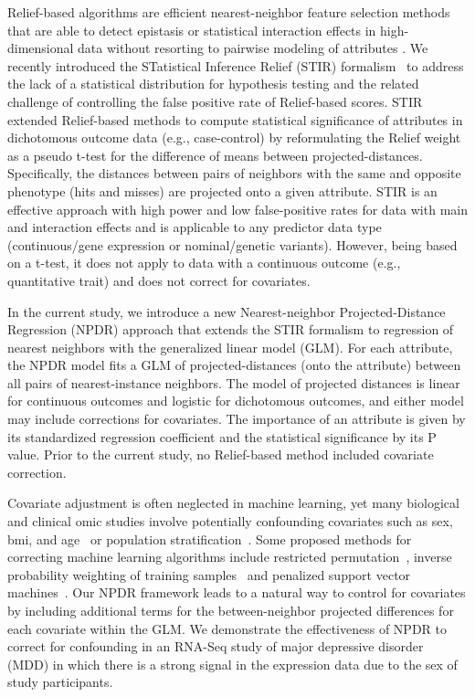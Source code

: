 \documentclass[10pt]{article}
\begin{document}
Relief-based algorithms are efficient nearest-neighbor feature selection methods that are able to detect epistasis or statistical interaction effects in high-dimensional data without resorting to pairwise modeling of attributes \cite{urbanowicz17b,kononenko97, mckinney09, robnik2003theoretical}.
We recently introduced the STatistical Inference Relief (STIR) formalism~\cite{stir} to address the lack of a statistical distribution for hypothesis testing and the related challenge of controlling the false positive rate of Relief-based scores.
STIR extended Relief-based methods to compute statistical significance of attributes in dichotomous outcome data (e.g., case-control) by reformulating the Relief weight~\cite{mckinney13} as a pseudo t-test for the difference of means between projected-distances. Specifically, the distances between pairs of neighbors with the same and opposite phenotype (hits and misses) are projected onto a given attribute. STIR is an effective approach with high power and low false-positive rates for data with main and interaction effects and is applicable to any predictor data type (continuous/gene expression or nominal/genetic variants). However, being based on a t-test, it does not apply to data with a continuous outcome (e.g., quantitative trait) and does not correct for covariates.

In the current study, we introduce a new Nearest-neighbor Projected-Distance Regression (NPDR) approach that extends the STIR formalism to regression of nearest neighbors with the generalized linear model (GLM). For each attribute, the NPDR model fits a GLM of projected-distances (onto the attribute) between all pairs of nearest-instance neighbors.
The model of projected distances is linear for continuous outcomes and logistic for dichotomous outcomes, and either model may include corrections for covariates.
The importance of an attribute is given by its standardized regression coefficient and the statistical significance by its P value. Prior to the current study, no Relief-based method included covariate correction.  

Covariate adjustment is often neglected in machine learning, yet many biological and clinical omic studies involve potentially confounding covariates such as sex, bmi, and age~\cite{le18_brainagesim} or population stratification~\cite{popstrat16}.
Some proposed methods for correcting machine learning algorithms include restricted permutation~\cite{rao2017}, inverse probability weighting of training samples~\cite{linn2016} and penalized support vector machines~\cite{li2011ccsvm}.
Our NPDR framework leads to a natural way to control for covariates by including additional terms for the between-neighbor projected differences for each covariate within the GLM.
We demonstrate the effectiveness of NPDR to correct for confounding in an RNA-Seq study of major depressive disorder (MDD) in which there is a strong signal in the expression data due to the sex of study participants. 
\end{document}
